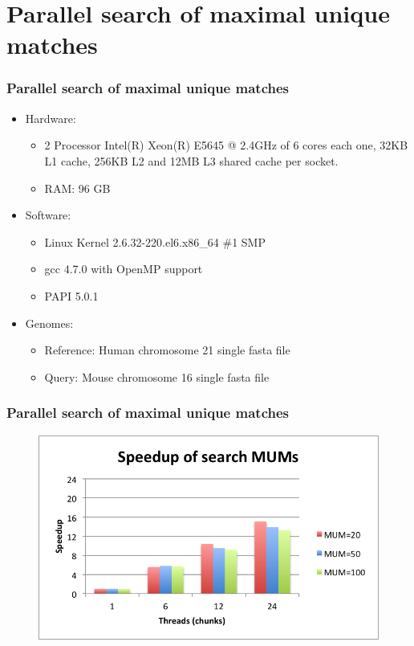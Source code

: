 \documentclass{beamer}
\begin{document}
\section{Parallel search of maximal unique matches}
\begin{frame}
  \frametitle{Parallel search of maximal unique matches}
  \begin{block}{}
\begin{itemize}
\item Hardware:  
\begin{itemize}
\item 2 Processor Intel(R) Xeon(R) E5645 @ 2.4GHz of 6 cores each one, 32KB L1 cache, 256KB L2 and 12MB L3 shared cache per socket.
\item RAM: 96 GB
\end{itemize} 
\item  Software: 
\begin{itemize}
\item Linux Kernel 2.6.32-220.el6.x86\_64 \#1 SMP
\item gcc 4.7.0 with OpenMP support
\item PAPI 5.0.1
\end{itemize}  
\item Genomes:
  \begin{itemize}
    \item Reference: Human chromosome 21 single fasta file
    \item Query: Mouse chromosome 16 single fasta file
  \end{itemize}
\end{itemize}
  \end{block}
\end{frame}
\begin{frame}
  \frametitle{Parallel search of maximal unique matches}
  \begin{figure}\includegraphics[scale=0.8]{speedup.png} \end{figure}
\end{frame}
  
\end{document}
